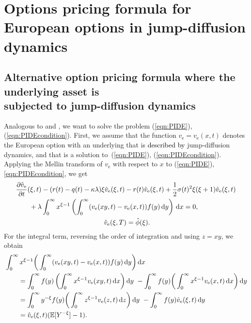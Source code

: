 \chapter[Options pricing formula for European options in jump-diffusion dynamics]{Options pricing formula for European options in jump-diffusion dynamics}

\section{Alternative option pricing formula where the underlying asset is \\
subjected to jump-diffusion dynamics}
Analogous to \cite{Merton1976} and \cite{Frontczak2013}, we want to solve the problem (\ref{eqn:PIDE}), (\ref{eqn:PIDEcondition}). First, we assume that the function $v_\text{e} = v_\text{e}(x,t)$ denotes the European option with an underlying that is \textcolor{black}{described by} jump-diffusion dynamics, and that is a solution to~(\ref{eqn:PIDE}), (\ref{eqn:PIDEcondition}). Applying the Mellin transform of $v_\text{e}$ with respect to $x$ to (\ref{eqn:PIDE}), \eqref{eqn:PIDEcondition}, we get
	\begin{align}
		\label{eqn:PIDEMellin}
		\begin{split}
		&\frac{\partial \hat v_\text{e}}{\partial t}(\xi,t) - (r(t) - q(t) - \kappa\lambda)\xi \hat v_\text{e}(\xi,t) -r(t)\hat v_\text{e}(\xi,t) + \frac{1}			{2}\sigma(t)^2\xi(\xi+1)\hat v_\text{e}(\xi,t) \\
		&\qquad + \lambda \int_0^\infty x^{\xi-1} \left( \int_0^\infty (v_\text{e}(xy,t) - v_\text{e}(x,t))f(y) \, \mathrm d y \right) \, \mathrm d x = 0, \\
		&\qquad \qquad \qquad \qquad \qquad \qquad \quad \hat v_\text{e}(\xi,T) = \hat \phi(\xi).
		\end{split}
	\end{align}
For the integral term, reversing the order of integration and using $z = xy$, we obtain
	\begin{align*}
		&\int_0^\infty x^{\xi-1} \bigg( \int_0^\infty (v_\text{e}(xy,t) - v_\text{e}(x,t))f(y) \, \mathrm d y \bigg) \, \mathrm d x \\
		&\qquad =\int_0^\infty f(y) \left( \int_0^\infty x^{\xi-1} v_\text{e}(xy,t) \, \mathrm d x \right) \mathrm d y \ - \int_0^\infty f(y) \bigg( \int_0^\infty x^{\xi-1}v_\text{e}(x,t) \, \mathrm d x \bigg) \, \mathrm d y \\
		&\qquad = \int_0^\infty y^{-\xi}f(y) \bigg( \int_0^\infty z^{\xi-1}v_\text{e}(z,t) \, \mathrm d z \bigg) \, \mathrm d y \ - \int_0^\infty f(y) \hat v_\text{e}(\xi,t) \, \mathrm d y \\
		&\qquad = \hat v_\text{e}(\xi,t) (\mathbb E[Y^{-\xi}]	 - 1).
	\end{align*}
